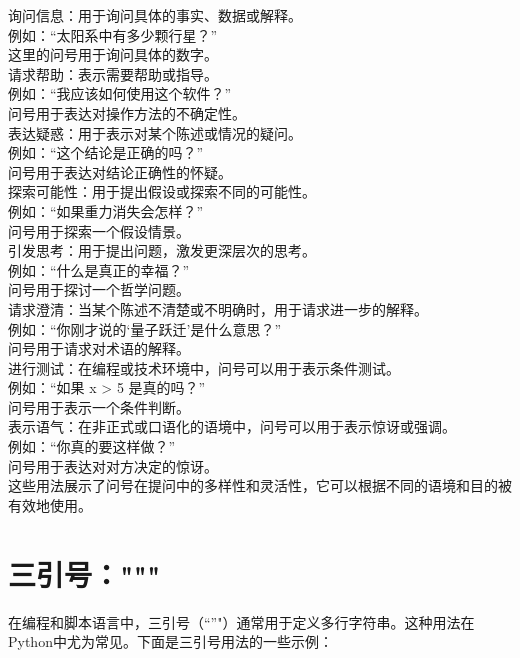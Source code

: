 \documentclass[12pt]{book}
\begin{document}
询问信息：用于询问具体的事实、数据或解释。\\
例如：“太阳系中有多少颗行星？”\\
这里的问号用于询问具体的数字。\\
请求帮助：表示需要帮助或指导。\\
例如：“我应该如何使用这个软件？”\\
问号用于表达对操作方法的不确定性。\\
表达疑惑：用于表示对某个陈述或情况的疑问。\\
例如：“这个结论是正确的吗？”\\
问号用于表达对结论正确性的怀疑。\\
探索可能性：用于提出假设或探索不同的可能性。\\
例如：“如果重力消失会怎样？”\\
问号用于探索一个假设情景。\\
引发思考：用于提出问题，激发更深层次的思考。\\
例如：“什么是真正的幸福？”\\
问号用于探讨一个哲学问题。\\
请求澄清：当某个陈述不清楚或不明确时，用于请求进一步的解释。\\
例如：“你刚才说的‘量子跃迁’是什么意思？”\\
问号用于请求对术语的解释。\\
进行测试：在编程或技术环境中，问号可以用于表示条件测试。\\
例如：“如果 x > 5 是真的吗？”\\
问号用于表示一个条件判断。\\
表示语气：在非正式或口语化的语境中，问号可以用于表示惊讶或强调。\\
例如：“你真的要这样做？”\\
问号用于表达对对方决定的惊讶。\\
这些用法展示了问号在提问中的多样性和灵活性，它可以根据不同的语境和目的被有效地使用。\\
\section{三引号："""}
在编程和脚本语言中，三引号（“”"）通常用于定义多行字符串。这种用法在Python中尤为常见。下面是三引号用法的一些示例：\\
\end{document}
